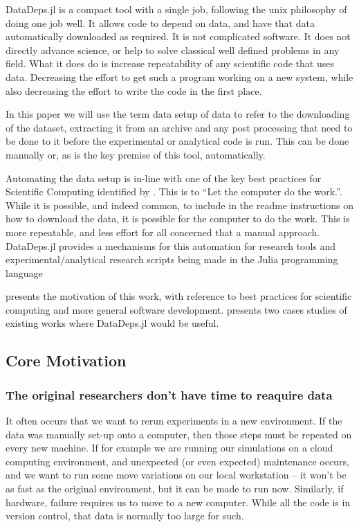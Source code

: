 \documentclass{jors}
\begin{document}
DataDeps.jl is a compact tool with a single job, following the unix philosophy of doing one job well.
It allows code to depend on data, and have that data automatically downloaded as required.
It is not complicated software.
It does not directly advance science, or help to solve classical well defined problems in any field.
What it does do is increase repeatability of any scientific code that uses data.
Decreasing the effort to get such a program working on a new system, while also decreasing the effort to write the code in the first place.


In this paper we will use the term data setup of data to refer to the downloading of the dataset, extracting it from an archive and any post processing that need to be done to it before the experimental or analytical code is run.
This can be done manually or, as is the key premise of this tool, automatically.


Automating the data setup is in-line with one of the key best practices for Scientific Computing identified by \textcite{10.1371/journal.pbio.1001745}.
This is to ``Let the computer do the work.''.
While it is possible, and indeed common, to include in the readme instructions on how to download the data, it is possible for the computer to do the work.
This is more repeatable, and less effort for all concerned that a manual approach.
DataDeps.jl provides a mechanisms for this automation for research tools and experimental/analytical research scripts being made in the Julia programming language 


 presents the motivation of this work, with reference to best practices for scientific computing and more general software development.
 presents two cases studies of existing works where DataDeps.jl would be useful.

\subsection{Core Motivation} \label{sec:motivation}

\subsubsection{The original researchers don't have time to reaquire data}
It often occurs that we want to rerun experiments in a new environment.
If the data was manually set-up onto a computer, then those steps must be repeated on every new machine.
If for example we are running our simulations on a cloud computing environment,
and unexpected (or even expected) maintenance occurs, and we want to run some move variations on our local workstation -- it won't be as fast as the original environment, but it can be made to run now.
Similarly, if hardware, failure requires us to move to a new computer.
While all the code is in version control, that data is normally too large for such.
\end{document}
